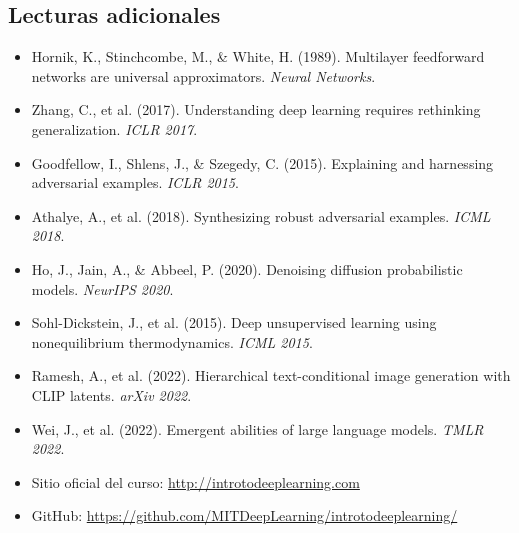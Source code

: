 \documentclass[a4paper]{article}
\begin{document}
\subsection{Lecturas adicionales}

\begin{itemize}
    \item Hornik, K., Stinchcombe, M., \& White, H. (1989). Multilayer feedforward networks are universal approximators. \textit{Neural Networks}.
    \item Zhang, C., et al. (2017). Understanding deep learning requires rethinking generalization. \textit{ICLR 2017}.
    \item Goodfellow, I., Shlens, J., \& Szegedy, C. (2015). Explaining and harnessing adversarial examples. \textit{ICLR 2015}.
    \item Athalye, A., et al. (2018). Synthesizing robust adversarial examples. \textit{ICML 2018}.
    \item Ho, J., Jain, A., \& Abbeel, P. (2020). Denoising diffusion probabilistic models. \textit{NeurIPS 2020}.
    \item Sohl-Dickstein, J., et al. (2015). Deep unsupervised learning using nonequilibrium thermodynamics. \textit{ICML 2015}.
    \item Ramesh, A., et al. (2022). Hierarchical text-conditional image generation with CLIP latents. \textit{arXiv 2022}.
    \item Wei, J., et al. (2022). Emergent abilities of large language models. \textit{TMLR 2022}.
    \item Sitio oficial del curso: \url{http://introtodeeplearning.com}
    \item GitHub: \url{https://github.com/MITDeepLearning/introtodeeplearning/}
\end{itemize}

\end{document}
